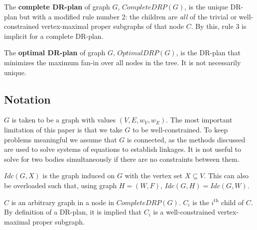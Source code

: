 \begin{definition}
    The \textbf{complete DR-plan} of graph $G$, $CompleteDRP(G)$, is the unique DR-plan but with a modified rule number 2: the children are \emph{all} of the trivial or well-constrained vertex-maximal proper subgraphs of that node $C$. By this, rule 3 is implicit for a complete DR-plan.
\end{definition}

\begin{definition}
    The \textbf{optimal DR-plan} of graph $G$, $OptimalDRP(G)$, is the DR-plan that minimizes the maximum fan-in over all nodes in the tree. It is not necessarily unique.
\end{definition}


\subsection{Notation}

$G$ is taken to be a graph with values $(V,E,w_V,w_E)$. The most important limitation of this paper is that we take $G$ to be well-constrained.
 To keep problems meaningful we assume that $G$ is connected, as the methods discussed are used to solve systems of equations to establish linkages. It is not useful to solve for two bodies simultaneously if there are no constraints between them.

$Idc(G,X)$ is the graph induced on $G$ with the vertex set $X\subseteq V$. This can also be overloaded such that, using graph $H=(W,F)$, $Idc(G,H)=Idc(G,W)$.

$C$ is an arbitrary graph in a node in $CompleteDRP(G)$. $C_i$ is the $i^{\text{th}}$ child of $C$. By definition of a DR-plan, it is implied that $C_i$ is a well-constrained vertex-maximal proper subgraph.
